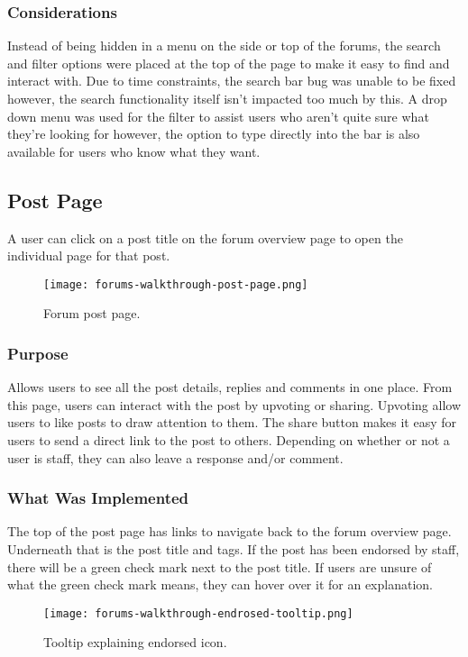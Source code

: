 \subsubsection{Considerations}
Instead of being hidden in a menu on the side or top of the forums, the search and filter options were placed at the top of the page to make it easy to find and interact with.
Due to time constraints, the search bar bug was unable to be fixed however, the search functionality itself isn't impacted too much by this.
A drop down menu was used for the filter to assist users who aren't quite sure what they're looking for however, the option to type directly into the bar is also available for users who know what they want.

\subsection{Post Page}
A user can click on a post title on the forum overview page to open the individual page for that post.

\begin{figure}[h!]
    \texttt{[image: forums-walkthrough-post-page.png]}
    \centering
    \caption{Forum post page.}
\end{figure}

\subsubsection{Purpose}
Allows users to see all the post details, replies and comments in one place.
From this page, users can interact with the post by upvoting or sharing.
Upvoting allow users to like posts to draw attention to them.
The share button makes it easy for users to send a direct link to the post to others.
Depending on whether or not a user is staff, they can also leave a response and/or comment.

\subsubsection{What Was Implemented}
The top of the post page has links to navigate back to the forum overview page.
Underneath that is the post title and tags.
If the post has been endorsed by staff, there will be a green check mark next to the post title.
If users are unsure of what the green check mark means, they can hover over it for an explanation.

\begin{figure}[h!]
    \texttt{[image: forums-walkthrough-endrosed-tooltip.png]}
    \centering
    \caption{Tooltip explaining endorsed icon.}
\end{figure}

